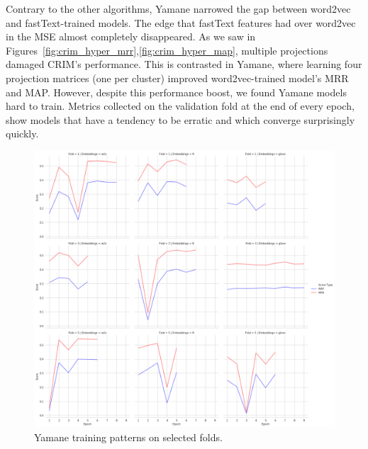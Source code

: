 Contrary to the other algorithms, Yamane narrowed the gap between word2vec and fastText-trained models.  The edge that fastText features had over word2vec in the \ac{MSE} almost completely disappeared.  As we saw in Figures~\ref{fig:crim_hyper_mrr},\ref{fig:crim_hyper_map}, multiple projections damaged CRIM's performance.  This is contrasted in Yamane, where learning four projection matrices (one per cluster) improved word2vec-trained model's \ac{MRR} and \ac{MAP}.  However, despite this performance boost, we found Yamane models hard to train.  Metrics collected on the validation fold at the end of every epoch, show models that have a tendency to be erratic and which converge surprisingly quickly.  
\begin{figure}[ht!] 
  \centering
  \includegraphics[width=1.\linewidth]{images/Yamane_training_patterns.png}
  \caption{Yamane training patterns on selected folds.}
  \label{fig:yamane_training_patterns}
\end{figure}
